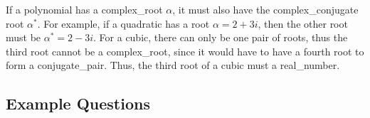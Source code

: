         If a \gls{polynomial} has a \gls{complex_root} $\alpha$, it must also have the \gls{complex_conjugate} \gls{root} $\alpha^*$.
        For example, if a \gls{quadratic} has a \gls{root} $\alpha=2+3i$, then the other \gls{root} must be $\alpha^*=2-3i$.
        For a \gls{cubic}, there can only be one pair of \glspl{root}, thus the third \gls{root} cannot be a \gls{complex_root}, since it would have to have a fourth \gls{root} to form a \gls{conjugate_pair}.
        Thus, the third \gls{root} of a \gls{cubic} must a \gls{real_number}.

    \subsection{Example Questions}

